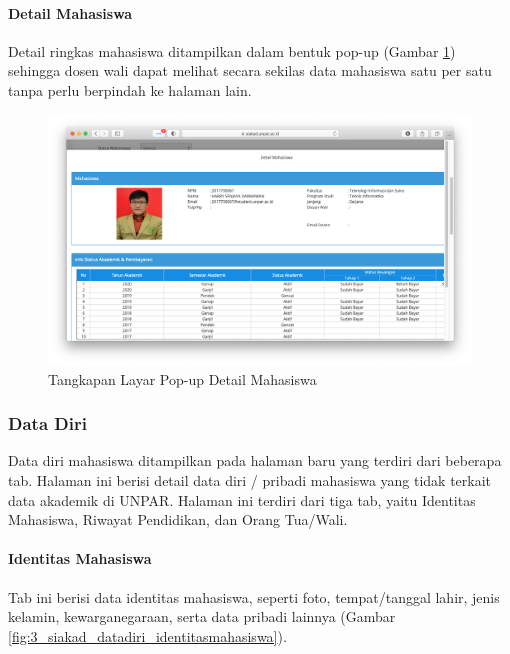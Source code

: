 \paragraph{Detail Mahasiswa} Detail ringkas mahasiswa ditampilkan dalam bentuk pop-up (Gambar \ref{fig:3_siakad_detailmahasiswa}) sehingga dosen wali dapat melihat secara sekilas data mahasiswa satu per satu tanpa perlu berpindah ke halaman lain.

\begin{figure}[H]
    \centering
    \includegraphics[scale=0.34]{Gambar/siakad_detailmahasiswa.png}
    \caption{Tangkapan Layar Pop-up Detail Mahasiswa}
    \label{fig:3_siakad_detailmahasiswa}
\end{figure}

\subsubsection{Data Diri}

Data diri mahasiswa ditampilkan pada halaman baru yang terdiri dari beberapa tab. Halaman ini berisi detail data diri / pribadi mahasiswa yang tidak terkait data akademik di UNPAR. Halaman ini terdiri dari tiga tab, yaitu Identitas Mahasiswa, Riwayat Pendidikan, dan Orang Tua/Wali.

\paragraph{Identitas Mahasiswa} Tab ini berisi data identitas mahasiswa, seperti foto, tempat/tanggal lahir, jenis kelamin, kewarganegaraan, serta data pribadi lainnya (Gambar \ref{fig:3_siakad_datadiri_identitasmahasiswa}).

